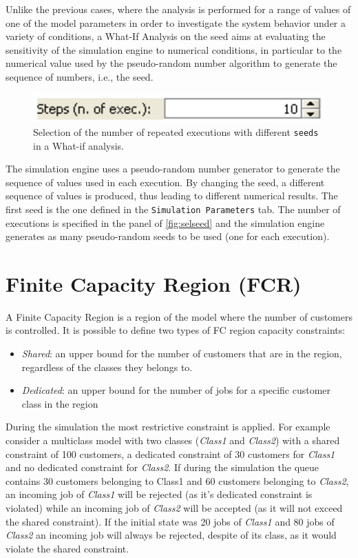 \begin{itemize}
Unlike the previous cases, where the analysis is performed for a
range of values of one of the model parameters in order to
investigate the system behavior under a variety of conditions, a
What-If Analysis on the seed aims at evaluating the sensitivity of
the simulation engine to numerical conditions, in particular to
the numerical value used by the pseudo-random number algorithm to
generate the sequence of numbers, i.e., the seed.
\begin{figure}[hbt]
    \begin{center}
        \includegraphics[scale=.5]{img/jsimg/7.7.eps}
    \end{center}
    \caption{Selection of the number of repeated executions with
    different \texttt{seeds} in a What-if analysis.}
    \label{fig:selseed}
\end{figure}
The simulation engine uses a pseudo-random number generator to
generate the sequence of values used in each execution. By
changing the seed, a different sequence of values is produced,
thus leading to different numerical results. The first seed is the
one defined in the \texttt{Simulation Parameters} tab. The number
of executions is specified in the panel of \autoref{fig:selseed}
and the simulation engine generates as many pseudo-random seeds to
be used (one for each execution).
\end{itemize}

\section{Finite Capacity Region (FCR)}
\label{defcap}


A Finite Capacity Region is a region of the model where the number
of customers is controlled. It is possible to define two types of
FC region capacity constraints:
\begin{itemize}
\item \emph{Shared}: an upper bound for the number of customers
that are in the region, regardless of the classes they belongs to.
\item \emph{Dedicated}: an upper bound for the number of jobs for
a specific customer class in the region
\end{itemize}
During the simulation the most restrictive constraint is applied.
For example consider a multiclass model with two classes
(\emph{Class1} and \emph{Class2}) with a shared constraint of 100
customers, a dedicated constraint of 30 customers for
\emph{Class1} and no dedicated constraint for \emph{Class2}. If
during the simulation the queue contains 30 customers belonging to
Class1 and 60 customers belonging to \emph{Class2}, an incoming
job of \emph{Class1} will be rejected (as it's dedicated
constraint is violated) while an incoming job of \emph{Class2}
will be accepted (as it will not exceed the shared constraint). If
the initial state was 20 jobs of \emph{Class1} and 80 jobs of
\emph{Class2} an incoming job will always be rejected, despite of
its class, as it would violate the shared constraint.\\


